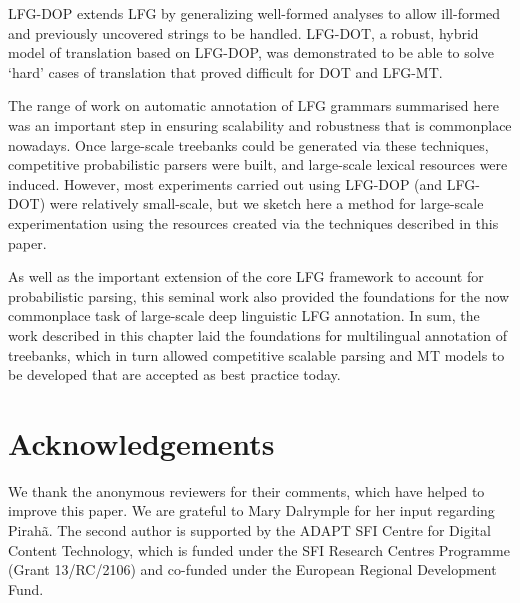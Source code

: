 \documentclass[output=paper,hidelinks]{langscibook}
\begin{document}
LFG-DOP extends LFG by generalizing well-formed analyses to allow ill-for\-med and previously uncovered strings to be handled. LFG-DOT, a robust, hybrid model of translation based on LFG-DOP, was demonstrated to be able to solve `hard' cases of translation that proved difficult for DOT and LFG-MT.

The range of work on automatic annotation of LFG grammars summarised here was an important step in ensuring scalability and robustness that is commonplace nowadays. Once large-scale treebanks could be generated via these techniques, competitive probabilistic parsers were built, and large-scale lexical resources were induced. However, most experiments carried out using LFG-DOP (and LFG-DOT) were relatively small-scale, but we sketch here a method for large-scale experimentation using the resources created via the techniques described in this paper. 

As well as the important extension of the core LFG framework to account for probabilistic parsing, this seminal work also provided the foundations for the now commonplace task of large-scale deep linguistic LFG
annotation. In sum, the work described in this chapter laid the foundations for multilingual annotation of treebanks, which in turn allowed competitive scalable parsing and MT models to be developed that are accepted as best practice today.





\section*{Acknowledgements}
We thank the anonymous reviewers for their comments, which have helped to improve this paper. We are grateful to Mary Dalrymple for her input regarding Pirah\~a. The second author is supported by the ADAPT SFI Centre for Digital
Content Technology, which is funded under
the SFI Research Centres Programme (Grant
13/RC/2106) and co-funded
under the European Regional Development Fund.


\sloppy\printbibliography[heading=subbibliography,notkeyword=this]
\end{document}
